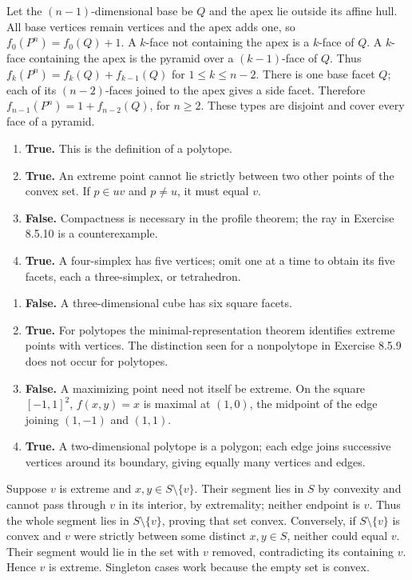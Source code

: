 Let the $(n-1)$-dimensional base be $Q$ and the apex lie outside its affine hull.
All base vertices remain vertices and the apex adds one, so
$f_0(P^n)=f_0(Q)+1$.
A $k$-face not containing the apex is a $k$-face of $Q$.
A $k$-face containing the apex is the pyramid over a $(k-1)$-face of $Q$.
Thus $f_k(P^n)=f_k(Q)+f_{k-1}(Q)$ for $1\le k\le n-2$.
There is one base facet $Q$; each of its $(n-2)$-faces joined to the apex
gives a side facet. Therefore $f_{n-1}(P^n)=1+f_{n-2}(Q)$, for $n\ge2$.
These types are disjoint and cover every face of a pyramid.

\begin{enumerate}[label=(\alph*)]
\item \textbf{True.} This is the definition of a polytope.
\item \textbf{True.} An extreme point cannot lie strictly between two
other points of the convex set. If $p\in uv$ and $p\ne u$, it must equal $v$.
\item \textbf{False.} Compactness is necessary in the profile theorem;
the ray in Exercise 8.5.10 is a counterexample.
\item \textbf{True.} A four-simplex has five vertices; omit one at a
time to obtain its five facets, each a three-simplex, or tetrahedron.
\end{enumerate}

\begin{enumerate}[label=(\alph*)]
\item \textbf{False.} A three-dimensional cube has six square facets.
\item \textbf{True.} For polytopes the minimal-representation theorem
identifies extreme points with vertices. The distinction seen for a nonpolytope
in Exercise 8.5.9 does not occur for polytopes.
\item \textbf{False.} A maximizing point need not itself be extreme.
On the square $[-1,1]^2$, $f(x,y)=x$ is maximal at $(1,0)$, the midpoint
of the edge joining $(1,-1)$ and $(1,1)$.
\item \textbf{True.} A two-dimensional polytope is a polygon; each edge
joins successive vertices around its boundary, giving equally many vertices and edges.
\end{enumerate}

Suppose $v$ is extreme and $x,y\in S\setminus\{v\}$.
Their segment lies in $S$ by convexity and cannot pass through $v$ in its
interior, by extremality; neither endpoint is $v$. Thus the whole segment
lies in $S\setminus\{v\}$, proving that set convex.
Conversely, if $S\setminus\{v\}$ is convex and $v$ were strictly between
some distinct $x,y\in S$, neither could equal $v$.
Their segment would lie in the set with $v$ removed, contradicting its
containing $v$. Hence $v$ is extreme. Singleton cases work because the empty set is convex.

